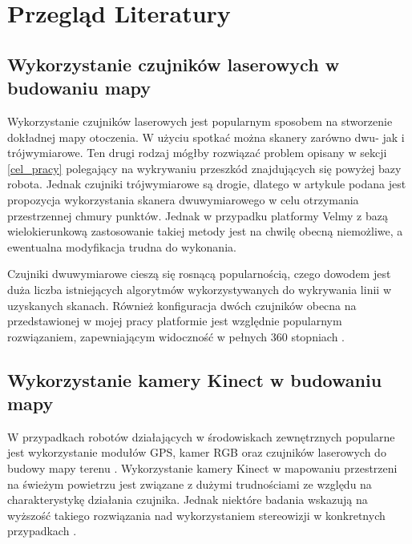 \section{Przegląd Literatury}
\label{przeglad_literatury}

\subsection{Wykorzystanie czujników laserowych w budowaniu mapy}
	Wykorzystanie czujników laserowych jest popularnym sposobem na stworzenie dokładnej mapy otoczenia. W użyciu spotkać można skanery zarówno dwu- jak i trójwymiarowe. 
	Ten drugi rodzaj mógłby rozwiązać problem opisany w sekcji \ref{cel_pracy} polegający na wykrywaniu przeszkód znajdujących się powyżej bazy robota.
	Jednak czujniki trójwymiarowe są drogie, dlatego w artykule \cite{rejas2015environment} podana jest propozycja wykorzystania skanera dwuwymiarowego w celu otrzymania przestrzennej chmury punktów.
	Jednak w przypadku platformy Velmy z bazą wielokierunkową zastosowanie takiej metody jest na chwilę obecną niemożliwe, a ewentualna modyfikacja trudna do wykonania.
	
	Czujniki dwuwymiarowe cieszą się rosnącą popularnością, czego dowodem jest duża liczba istniejących algorytmów wykorzystywanych do wykrywania linii w uzyskanych skanach. 
	Również konfiguracja dwóch czujników obecna na przedstawionej w mojej pracy platformie jest względnie popularnym rozwiązaniem, zapewniającym widoczność w pełnych $360$ stopniach \cite{nguyen2005comparison}. 
	
	
	
\subsection{Wykorzystanie kamery Kinect w budowaniu mapy}
	W przypadkach robotów działających w środowiskach zewnętrznych popularne jest wykorzystanie modułów GPS, kamer RGB oraz czujników laserowych do budowy mapy terenu \cite{shalal2015orchard}.
	Wykorzystanie kamery Kinect w mapowaniu przestrzeni na świeżym powietrzu jest związane z dużymi trudnościami ze względu na charakterystykę działania czujnika. Jednak niektóre badania wskazują na wyższość takiego rozwiązania nad wykorzystaniem stereowizji w konkretnych przypadkach \cite{hernandez2016using}. 

